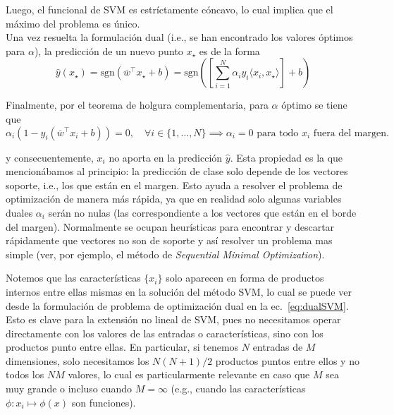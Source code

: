 Luego, el funcional de SVM es estríctamente cóncavo, lo cual implica que el máximo del problema es único.\\

 Una vez resuelta la formulación dual (i.e., se han encontrado los valores óptimos para $\alpha$), la predicción de un nuevo punto $x_\star$ es de la forma 
\begin{equation}
 	\hat{y}(x_\star)= \text{sgn} (\overline{w}^\top x_\star + b) = \text{sgn}\left(\left[\sum\limits_{i=1}^{N} \alpha_i y_i \langle x_i, x_\star\rangle\right] + b\right)
 \end{equation}
 
Finalmente, por el teorema de holgura complementaria, para $\alpha$ óptimo se tiene que
\begin{equation}
	\alpha_i \left(1-y_i (\overline{w}^\top x_i +b)\right) = 0,\quad \forall i\in\{1,\ldots,N\}\implies \alpha_i=0\text{ para todo $x_i$ fuera del margen.}
\end{equation}

y consecuentemente, $x_i$ no aporta en la predicción $\hat{y}$. Esta propiedad es la que mencionábamos al principio: la predicción de clase solo depende de los vectores soporte, i.e., los que están en el margen. Esto ayuda a resolver el problema de optimización de manera más rápida, ya que en realidad solo algunas variables duales $\alpha_i$ serán no nulas (las correspondiente a los vectores que están en el borde del margen). Normalmente se ocupan heurísticas para encontrar y descartar rápidamente que vectores no son de soporte y así resolver un problema mas simple (ver, por ejemplo, el método de \emph{Sequential Minimal Optimization}). 


\begin{remark} Notemos que las características $\{x_i\}$ solo aparecen en forma de productos internos entre ellas mismas en la solución del método SVM, lo cual se puede ver desde la formulación de problema de optimización dual en la ec.~\eqref{eq:dualSVM}. Esto es clave para la extensión no lineal de SVM, pues no necesitamos operar directamente  con los valores de las entradas o características, sino con los productos punto entre ellas. En particular, si tenemos $N$ entradas de $M$ dimensiones, solo necesitamos los $N(N+1)/2$ productos puntos entre ellos y no todos los $NM$ valores, lo cual es particularmente relevante en caso que $M$ sea muy grande o incluso cuando $M=\infty$ (e.g., cuando las características $\phi:x_i\mapsto \phi(x)$ son funciones).
\end{remark} 


